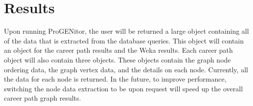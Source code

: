 \chapter{Results}
\label{chap:results}
Upon running ProGENitor, the user will be returned a large object
containing all of the data that is extracted from the database queries.  This
object will contain an object for the career path results and the Weka
results.  Each career path object will also contain three objects.  These
objects contain the graph node ordering data, the graph vertex data, and the
details on each node.  Currently, all the data for each node is returned.  In
the future, to improve performance, switching the node data extraction to be
upon request will speed up the overall career path graph results.






